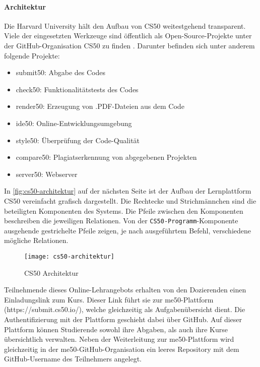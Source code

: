 \newpage

\paragraph{Architektur}
Die Harvard University hält den Aufbau von CS50 weitestgehend transparent.
Viele der eingesetzten Werkzeuge sind öffentlich als Open-Source-Projekte unter
der GitHub-Organisation \glqq CS50\grqq{} zu finden \parencite{cs50-github}.
Darunter befinden sich unter anderem folgende Projekte:
\begin{itemize}
\item submit50: Abgabe des Codes
\item check50: Funktionalitätstests des Codes
\item render50: Erzeugung von .PDF-Dateien aus dem Code
\item ide50: Online-Entwicklungsumgebung
\item style50: Überprüfung der Code-Qualität
\item compare50: Plagiatserkennung von abgegebenen Projekten
\item server50: Webserver
\end{itemize}

In \autoref{fig:cs50-architektur} auf der nächsten Seite ist der Aufbau der
Lernplattform CS50 vereinfacht grafisch dargestellt. Die Rechtecke und
Strichmännchen sind die beteiligten Komponenten des Systems. Die Pfeile zwischen
den Komponenten beschreiben die jeweiligen Relationen. Von der
\texttt{CS50-Programm}-Komponente ausgehende gestrichelte Pfeile zeigen, je nach 
ausgeführtem Befehl, verschiedene mögliche Relationen.

\begin{figure}[h]
    \centering
    \texttt{[image: cs50-architektur]}
    \caption{CS50 Architektur}
    \label{fig:cs50-architektur}
\end{figure}

Teilnehmende dieses Online-Lehrangebots erhalten von den Dozierenden einen
Einladungslink zum Kurs. Dieser Link führt sie zur me50-Plattform
(https://submit.cs50.io/), welche gleichzeitig als Aufgabenübersicht dient. Die
Authentifizierung mit der Plattform geschieht dabei über GitHub. Auf dieser
Plattform können Studierende sowohl ihre Abgaben, als auch ihre Kurse
übersichtlich verwalten. Neben der Weiterleitung zur me50-Plattform wird
gleichzeitig in der me50-GitHub-Organisation ein leeres Repository mit dem
GitHub-Username des Teilnehmers angelegt.

